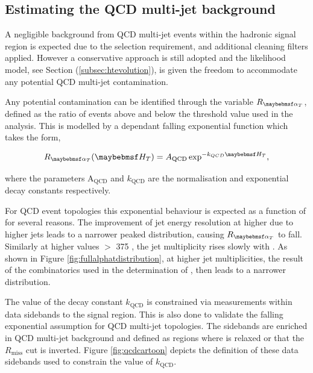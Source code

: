\subsection{Estimating the QCD multi-jet background}
\label{subsec:qcdbackground}

A negligible background from QCD multi-jet events within the hadronic signal region is expected due to the selection requirement, and additional cleaning filters applied. However a conservative approach is still adopted and the likelihood model, see Section (\ref{subsec:htevolution}), is given the freedom to accommodate any potential QCD multi-jet contamination. 

Any potential contamination can be identified through the variable $R_{\alphat}$, defined as the ratio of events above and below the \alphat threshold value used in the analysis. This is modelled by a \theht dependant falling exponential function which takes the form,

\begin{equation}
\label{eq:qcdmodel}
R_{\alphat}(\theht) =  A_{\text{QCD}} \exp^{-k_{QCD}\theht},
\end{equation}

where the parameters A$_{\text{QCD}}$ and $k_{\text{QCD}}$ are the normalisation and exponential decay constants respectively. 

For QCD event topologies this exponential behaviour is expected as a function of \theht for several reasons. The improvement of jet energy resolution at higher \theht due to higher \pt jets leads to a narrower peaked distribution, causing $R_{\alphat}$ to fall. Similarly at higher \theht values $>$ 375 \GeV, the jet multiplicity rises slowly with \theht. As shown in Figure \ref{fig:fullalphatdistribution}, at higher jet multiplicities, the result of the combinatorics used in the determination of \alphat, then leads to a narrower distribution. 

The value of the decay constant $k_{\text{QCD}}$ is constrained via measurements within data sidebands to the signal region. This is also done to validate the falling exponential assumption for QCD multi-jet topologies. The sidebands are enriched in QCD multi-jet background and defined as regions where \alphat is relaxed or that the $R_{\text{miss}}$ cut is inverted. Figure \ref{fig:qcdcartoon} depicts the definition of these data sidebands used to constrain the value of $k_{\text{QCD}}$.

